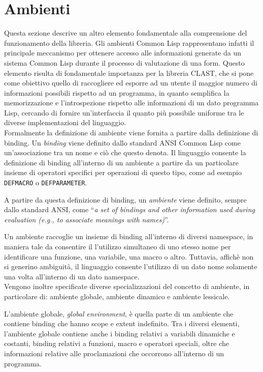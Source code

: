 \section{Ambienti}
\label{environments}

Questa sezione descrive un altro elemento fondamentale alla comprensione del
funzionamento della libreria. Gli ambienti Common Lisp rappresentano infatti il
principale meccanismo per ottenere accesso alle informazioni generate da un
sistema Common Lisp durante il processo di valutazione di una form. Questo
elemento risulta di fondamentale importanza per la libreria CLAST, che si pone
come obiettivo quello di raccogliere ed esporre ad un utente il maggior numero
di informazioni possibili rispetto ad un programma, in quanto semplifica la
memorizzazione e l'introspezione rispetto alle informazioni di un dato programma
Lisp, cercando di fornire un'interfaccia il quanto più possibile uniforme tra le
diverse implementazioni del linguaggio.\\

Formalmente la definizione di ambiente viene fornita a partire dalla definizione
di binding. Un \textit{binding} viene definito dallo standard ANSI Common Lisp
come un'associazione tra un nome e ciò che questo denota. Il linguaggio consente
la definizione di binding all'interno di un ambiente a partire da un particolare
insieme di operatori specifici per operazioni di questo tipo, come ad esempio
\texttt{DEFMACRO} o \texttt{DEFPARAMETER}.

A partire da questa definizione di binding, un \textit{ambiente} viene definito,
sempre dallo standard ANSI, come \enquote{\textit{a set of bindings and other
information used during evaluation (e.g., to associate meanings with names)}}.

Un ambiente raccoglie un insieme di binding all'interno di diversi namespace,
in maniera tale da consentire il l'utilizzo simultaneo di uno stesso nome per
identificare una funzione, una variabile, una macro o altro. Tuttavia, affichè
non si generino ambiguità, il linguaggio consente l'utilizzo di un dato nome
solamente una volta all'interno di un dato namespace.\\

Vengono inoltre specificate diverse specializzazioni del concetto di ambiente,
in particolare di: ambiente globale, ambiente dinamico e ambiente lessicale.

L'ambiente globale, \textit{global environment}, è quella parte di un ambiente
che contiene binding che hanno scope e extent indefinito. Tra i diversi
elementi, l'ambiente globale contiene anche i binding relativi a variabili
dinamiche e costanti, binding relativi a funzioni, macro e operatori speciali,
oltre che informazioni relative alle proclamazioni che occorrono all'interno di
un programma.

